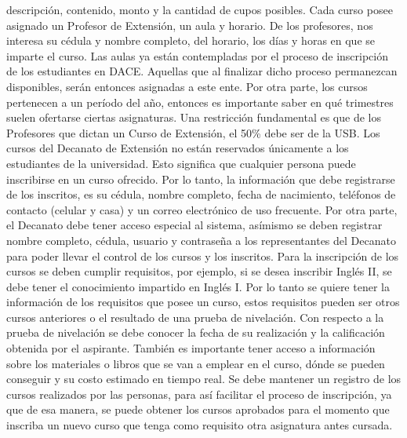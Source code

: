\documentclass[12pt,a4paper,spanish]{article}
\begin{document}
descripci\'on, contenido, monto y la cantidad de cupos posibles. Cada
curso posee asignado un Profesor de Extensi\'on, un aula y horario. De los
profesores, nos interesa su c\'edula y nombre completo, del horario,
los d\'ias y horas en que se imparte el curso. Las aulas ya est\'an
contempladas por el proceso de inscripci\'on de los estudiantes en
DACE. Aquellas que al finalizar dicho proceso permanezcan disponibles,
ser\'an entonces asignadas a este ente. Por otra parte, los cursos
pertenecen a un per\'iodo del a\~no, entonces es importante saber en
qu\'e trimestres suelen ofertarse ciertas asignaturas. Una
restricci\'on fundamental es que de los Profesores que dictan un Curso
de Extensi\'on, el 50\% debe ser de la USB.
\newline
\newline
\indent Los cursos del Decanato de Extensi\'on no est\'an reservados
\'unicamente a los estudiantes de la universidad. Esto significa que
cualquier persona puede inscribirse en un curso ofrecido. Por lo tanto, 
la informaci\'on que debe registrarse de los inscritos, es su
c\'edula, nombre completo, fecha de nacimiento, tel\'efonos de
contacto (celular y casa) y un correo electr\'onico de uso
frecuente. Por otra parte, el Decanato debe tener acceso especial
al sistema, as\'imismo se deben registrar nombre completo, c\'edula, 
usuario y contrase\~na a los representantes del Decanato para poder llevar 
el control de los cursos y los inscritos.
\newline
\newline
\indent Para la inscripci\'on de los cursos se deben cumplir
requisitos, por ejemplo, si se desea inscribir Ingl\'es II, se debe
tener el conocimiento impartido en Ingl\'es I. Por lo tanto se quiere 
tener la informaci\'on de los requisitos que posee un curso, estos
requisitos pueden ser otros cursos anteriores o el resultado de una
prueba de nivelaci\'on. Con respecto a la prueba de nivelaci\'on se debe conocer la fecha
de su realizaci\'on y la calificaci\'on obtenida por el aspirante. Tambi\'en es importante
tener acceso a informaci\'on sobre los materiales o libros que se van a emplear en el curso,
d\'onde se pueden conseguir y su costo estimado en tiempo real. 
\newline
\newline
\indent Se debe mantener un registro de los cursos
realizados por las personas, para as\'i facilitar el proceso de
inscripci\'on, ya que de esa manera, se puede obtener los cursos
aprobados para el momento que inscriba un nuevo curso que tenga como
requisito otra asignatura antes cursada. 
\end{document}
